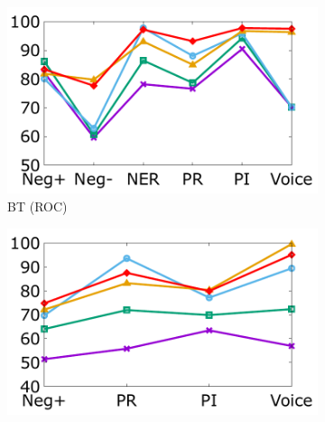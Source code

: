 

\begin{figure}[th]
\centering

\begin{subfigure}[b]{0.162\textwidth}
\centering
\includegraphics[width=\columnwidth]{data/roc_bert.pdf}
\caption{BT (ROC)}
\label{fig:roc_bert}
\end{subfigure}
\hfill
\begin{subfigure}[b]{0.162\textwidth}
\centering
\includegraphics[width=\columnwidth]{data/copa_bert.pdf}

\end{subfigure}
\end{figure}
